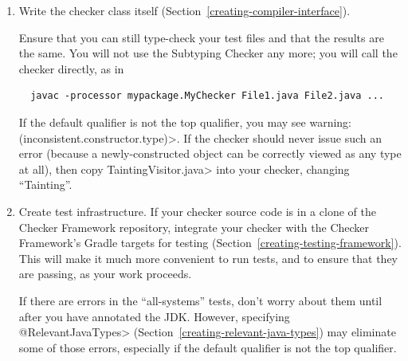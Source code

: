 \begin{enumerate}
  If you are working in a clone of the Checker Framework, put the above
  test case in file \<checker/tests/\emph{mycheckername}/TestHierarchy.java>.

  Type-check your test files using the Subtyping Checker
  (), using a command like

\begin{small}
\begin{Verbatim}
javacheck \
  -processor org.checkerframework.common.subtyping.SubtypingChecker \
  -Aquals=org.checkerframework.checker.mycheckername.qual.MyTopQual,org.checkerframework.checker.mycheckername.qual.MyBottomQual \
  TestHierarchy.java
\end{Verbatim}
\end{small}


\item
\label{creating-tips-implement-checker}
  Write the checker class itself
  (Section~\ref{creating-compiler-interface}).

  Ensure that you can still type-check your test files and that the results
  are the same.  You will not use the Subtyping Checker any more; you will
  call the checker directly, as in

\begin{Verbatim}
  javac -processor mypackage.MyChecker File1.java File2.java ...
\end{Verbatim}

  If the default qualifier is not the top qualifier, you may see \<warning:
  (inconsistent.constructor.type)>.  If the checker should never issue such
  an error (because a newly-constructed object can be correctly viewed as
  any type at all), then copy \<TaintingVisitor.java> into your checker,
  changing ``Tainting''.

\item
\label{creating-tips-test-infrastructure}
  Create test infrastructure.
  If your checker source code is in a clone of the Checker Framework
  repository, integrate your checker with the Checker Framework's Gradle
  targets for testing (Section~\ref{creating-testing-framework}).  This
  will make it much more convenient to run tests, and to ensure that they
  are passing, as your work proceeds.

  If there are errors in the ``all-systems'' tests, don't worry about them
  until after you have annotated the JDK\@.  However, specifying
  \<@RelevantJavaTypes> (Section~\ref{creating-relevant-java-types}) may
  eliminate some of those errors, especially if the default qualifier is
  not the top qualifier.


\end{enumerate}
